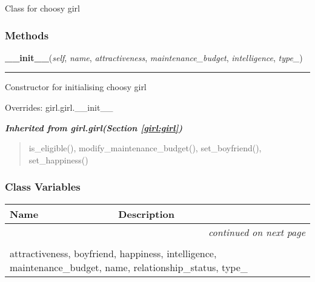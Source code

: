 Class for choosy girl



  \subsubsection{Methods}

    \vspace{0.5ex}

\hspace{.8\funcindent}\begin{boxedminipage}{\funcwidth}

    \raggedright \textbf{\_\_init\_\_}(\textit{self}, \textit{name}, \textit{attractiveness}, \textit{maintenance\_budget}, \textit{intelligence}, \textit{type\_})

    \vspace{-1.5ex}

    \rule{\textwidth}{0.5\fboxrule}
\setlength{\parskip}{2ex}
    Constructor for initialising choosy girl

\setlength{\parskip}{1ex}
      Overrides: girl.girl.\_\_init\_\_

    \end{boxedminipage}


\large{\textbf{\textit{Inherited from girl.girl\textit{(Section \ref{girl:girl})}}}}

\begin{quote}
is\_eligible(), modify\_maintenance\_budget(), set\_boyfriend(), set\_happiness()
\end{quote}


  \subsubsection{Class Variables}

    \vspace{-1cm}
\hspace{\varindent}\begin{longtable}{|p{\varnamewidth}|p{\vardescrwidth}|l}
\cline{1-2}
\cline{1-2} \centering \textbf{Name} & \centering \textbf{Description}& \\
\cline{1-2}
\endhead\cline{1-2}\multicolumn{3}{r}{\small\textit{continued on next page}}\\\endfoot\cline{1-2}
\endlastfoot\multicolumn{2}{|l|}{\textit{Inherited from girl.girl \textit{(Section \ref{girl:girl})}}}\\
\multicolumn{2}{|p{\varwidth}|}{\raggedright attractiveness, boyfriend, happiness, intelligence, maintenance\_budget, name, relationship\_status, type\_}\\
\cline{1-2}
\end{longtable}

